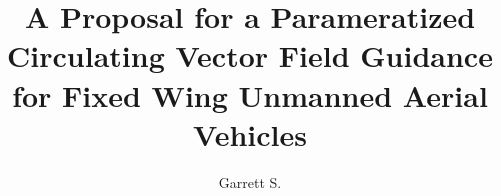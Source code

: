 \documentclass[numbered,pdftex]{ohio-etd}
\title     {A Proposal for a Parameratized Circulating Vector Field Guidance for Fixed Wing Unmanned Aerial Vehicles}
\author    {Garrett S.}{Clem}
\begin{document}
\makefrontmatter    %



%
%	
%
%
%
%
%
%
%
%
%
% 
%
%
%
%
%
%
%
%
%
%
%
%
%
%
%
%
%
\end{document}
